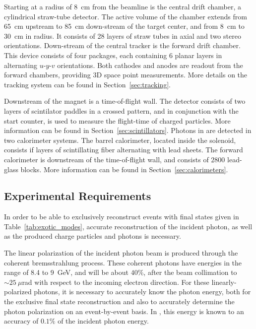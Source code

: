 Starting at a radius of 8~cm from the beamline is the central drift chamber, a cylindrical straw-tube detector. The active volume of the chamber extends from 65~cm upstream to 85~cm down-stream of the target center, and from 8~cm to 30~cm in radius. It consists of 28 layers of straw tubes in axial and two stereo orientations. Down-stream of the central tracker is the forward drift chamber. This device consists of four packages, each containing 6 planar layers in alternating $u$-$y$-$v$ orientations. Both cathodes and anodes are readout from the forward chambers, providing 3D space point measurements. More details on the tracking system can be found in Section~\ref{sec:tracking}. 

Downstream of the magnet is a time-of-flight wall. The detector consists of two layers of scintilator paddles in a crossed pattern, and in conjunction with the start counter, is used to measure the flight-time of charged particles. More information can be found in Section~\ref{sec:scintillators}. 
Photons in \gx{} are detected in two calorimeter systems. The barrel calorimeter, located inside the solenoid, consists if layers of scintillating fiber alternating with lead sheets. The forward calorimeter is downstream of the time-of-flight wall, and consists of $2800$ lead-glass blocks. More information can be found in Section~\ref{sec:calorimeters}.

\subsection[Experimental Requirements]{Experimental Requirements \label{sec:intro:requirements}}
In order to be able to exclusively reconstruct events with final states given in Table~\ref{tab:exotic_modes},
accurate reconstruction of the incident photon, as well as the produced charge particles and photons
is necessary. 

The linear polarization of the incident photon beam is produced through the coherent 
bremsstrahlung process. These coherent photons have energies in the range of 8.4 to 9~GeV,
and will be about $40\%$, after the beam collimation to $\sim{}25~\mu$rad with respect to the incoming 
electron direction. For these linearly-polarized photons, it is necessary to accurately know the photon 
energy, both for the exclusive final state reconstruction and also to accurately determine the photon 
polarization on an event-by-event basis. In \GX{}, this energy is known to an accuracy of $0.1\%$ of the
incident photon energy.

